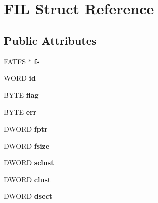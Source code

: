\hypertarget{struct_f_i_l}{\section{F\-I\-L Struct Reference}
\label{struct_f_i_l}
}
\subsection*{Public Attributes}
\begin{DoxyCompactItemize}
\item 
\hypertarget{struct_f_i_l_a42376a6797a06228911c8b836c1e9030}{\hyperlink{struct_f_a_t_f_s}{F\-A\-T\-F\-S} $\ast$ {\bfseries fs}}\label{struct_f_i_l_a42376a6797a06228911c8b836c1e9030}

\item 
\hypertarget{struct_f_i_l_af7cae0063b0045fb7078b560101ba8f2}{W\-O\-R\-D {\bfseries id}}\label{struct_f_i_l_af7cae0063b0045fb7078b560101ba8f2}

\item 
\hypertarget{struct_f_i_l_ac409508881f5a16f2998ae675072b376}{B\-Y\-T\-E {\bfseries flag}}\label{struct_f_i_l_ac409508881f5a16f2998ae675072b376}

\item 
\hypertarget{struct_f_i_l_aea440945db26de9c4a88065c0c887fda}{B\-Y\-T\-E {\bfseries err}}\label{struct_f_i_l_aea440945db26de9c4a88065c0c887fda}

\item 
\hypertarget{struct_f_i_l_a75d29cf9257c827d117887b9f924c4a9}{D\-W\-O\-R\-D {\bfseries fptr}}\label{struct_f_i_l_a75d29cf9257c827d117887b9f924c4a9}

\item 
\hypertarget{struct_f_i_l_aa00790d40d7b0081c345fd4f76e22b70}{D\-W\-O\-R\-D {\bfseries fsize}}\label{struct_f_i_l_aa00790d40d7b0081c345fd4f76e22b70}

\item 
\hypertarget{struct_f_i_l_ad308b74c8d6975c6a9c30d90b4124c40}{D\-W\-O\-R\-D {\bfseries sclust}}\label{struct_f_i_l_ad308b74c8d6975c6a9c30d90b4124c40}

\item 
\hypertarget{struct_f_i_l_aa41312aba551b9a6d1c9d3c8c7d2734b}{D\-W\-O\-R\-D {\bfseries clust}}\label{struct_f_i_l_aa41312aba551b9a6d1c9d3c8c7d2734b}

\item 
\hypertarget{struct_f_i_l_ab3d4165d6fd32ac71a130d835fbf0b4d}{D\-W\-O\-R\-D {\bfseries dsect}}\label{struct_f_i_l_ab3d4165d6fd32ac71a130d835fbf0b4d}


\end{DoxyCompactItemize}
